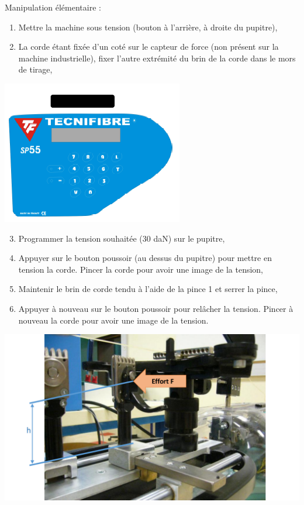 \begin{minipage}{0.65\linewidth}
 Manipulation élémentaire :
\begin{enumerate}
 \item Mettre la machine sous tension (bouton à l'arrière, à droite du pupitre),
 \item La corde étant fixée d'un coté sur le capteur de force (non présent sur la machine industrielle), fixer l'autre extrémité du brin de la corde dans le mors de tirage,
\end{enumerate}
\end{minipage}\hfill
\begin{minipage}{0.3\linewidth}
 \centering\includegraphics[width=0.7\linewidth]{img/cordeuse_com.png}
\end{minipage}
\begin{enumerate}
\setcounter{enumi}{2}
 \item Programmer la tension souhaitée (30 daN) sur le pupitre,
 \item Appuyer sur le bouton poussoir (au dessus du pupitre) pour mettre en tension la corde. Pincer la corde pour avoir une image de la tension,
 \item Maintenir le brin de corde tendu à l'aide de la pince 1 et serrer la pince,
 \item Appuyer à nouveau sur le bouton poussoir pour relâcher la tension. Pincer à nouveau la corde pour avoir une image de la tension.
\end{enumerate}

\begin{center}
	\includegraphics[width=0.6\linewidth]{img/figures.pdf}
\end{center}

